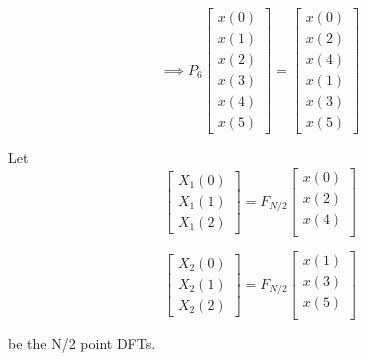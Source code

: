 \documentclass[journal,12pt,twocolumn]{IEEEtran}
\renewcommand\thesection{\arabic{section}}
\begin{document}
\begin{enumerate}[label=\thesection.\arabic*.,ref=\thesection.\theenumi]
\begin{equation}
\implies P_{6}
\begin{bmatrix}
x(0) \\ 
x(1) \\ 
x(2) \\ 
x(3) \\ 
x(4) \\ 
x(5)
\end{bmatrix}
 = 
\begin{bmatrix}
x(0) \\ 
x(2) \\ 
x(4) \\ 
x(1) \\ 
x(3) \\ 
x(5)
\end{bmatrix}
\end{equation}

Let 
\begin{equation}
\begin{bmatrix}
X_{1}(0) \\ 
X_{1}(1) \\ 
X_{1}(2) 
\end{bmatrix}
= F_{N/2}
\begin{bmatrix}
x(0) \\ 
x(2) \\ 
x(4) \\ 
\end{bmatrix}
\end{equation}

\begin{equation}
\begin{bmatrix}
X_{2}(0) \\ 
X_{2}(1) \\ 
X_{2}(2) 
\end{bmatrix}
= F_{N/2}
\begin{bmatrix}
x(1) \\ 
x(3) \\ 
x(5) \\ 
\end{bmatrix}
\end{equation}

be the N/2 point DFTs.


\end{enumerate}
\end{document}
